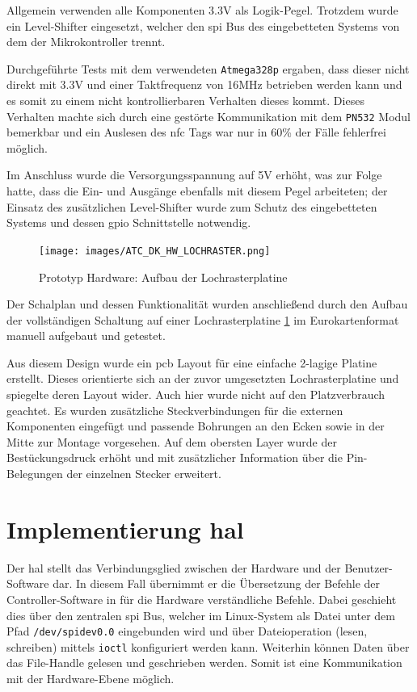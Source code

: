 Allgemein verwenden alle Komponenten 3.3V als Logik-Pegel. Trotzdem
wurde ein Level-Shifter eingesetzt, welcher den \gls{spi} Bus des
eingebetteten Systems von dem der Mikrokontroller trennt.

Durchgeführte Tests mit dem verwendeten
\passthrough{\lstinline!Atmega328p!} ergaben, dass dieser nicht direkt
mit 3.3V und einer Taktfrequenz von 16MHz betrieben werden kann und es
somit zu einem nicht kontrollierbaren Verhalten dieses kommt. Dieses
Verhalten machte sich durch eine gestörte Kommunikation mit dem
\passthrough{\lstinline!PN532!} Modul bemerkbar und ein Auslesen des
\gls{nfc} Tags war nur in 60\% der Fälle fehlerfrei möglich.

Im Anschluss wurde die Versorgungsspannung auf 5V erhöht, was zur Folge
hatte, dass die Ein- und Ausgänge ebenfalls mit diesem Pegel arbeiteten;
der Einsatz des zusätzlichen Level-Shifter wurde zum Schutz des
eingebetteten Systems und dessen \gls{gpio} Schnittstelle notwendig.

\begin{figure}
\centering
\texttt{[image: images/ATC\_DK\_HW\_LOCHRASTER.png]}
\caption{Prototyp Hardware: Aufbau der Lochrasterplatine
\label{ATC_DK_HW_LOCHRASTER}}
\end{figure}

Der Schalplan und dessen Funktionalität wurden anschließend durch den
Aufbau der vollständigen Schaltung auf einer Lochrasterplatine
\ref{ATC_DK_HW_LOCHRASTER} im Eurokartenformat manuell aufgebaut und
getestet.

Aus diesem Design wurde ein \gls{pcb} Layout für eine einfache 2-lagige
Platine erstellt. Dieses orientierte sich an der zuvor umgesetzten
Lochrasterplatine und spiegelte deren Layout wider. Auch hier wurde
nicht auf den Platzverbrauch geachtet. Es wurden zusätzliche
Steckverbindungen für die externen Komponenten eingefügt und passende
Bohrungen an den Ecken sowie in der Mitte zur Montage vorgesehen. Auf
dem obersten Layer wurde der Bestückungsdruck erhöht und mit
zusätzlicher Information über die Pin-Belegungen der einzelnen Stecker
erweitert.

\hypertarget{implementierung-hal}{%
\section{\texorpdfstring{Implementierung
\gls{hal}}{Implementierung }}\label{implementierung-hal}}

Der \gls{hal} stellt das Verbindungsglied zwischen der Hardware und der
Benutzer-Software dar. In diesem Fall übernimmt er die Übersetzung der
Befehle der Controller-Software in für die Hardware verständliche
Befehle. Dabei geschieht dies über den zentralen \gls{spi} Bus, welcher
im Linux-System als Datei unter dem Pfad
\passthrough{\lstinline!/dev/spidev0.0!} eingebunden wird und über
Dateioperation (lesen, schreiben) mittels
\passthrough{\lstinline!ioctl!} konfiguriert werden kann. Weiterhin
können Daten über das File-Handle gelesen und geschrieben werden. Somit
ist eine Kommunikation mit der Hardware-Ebene möglich.

